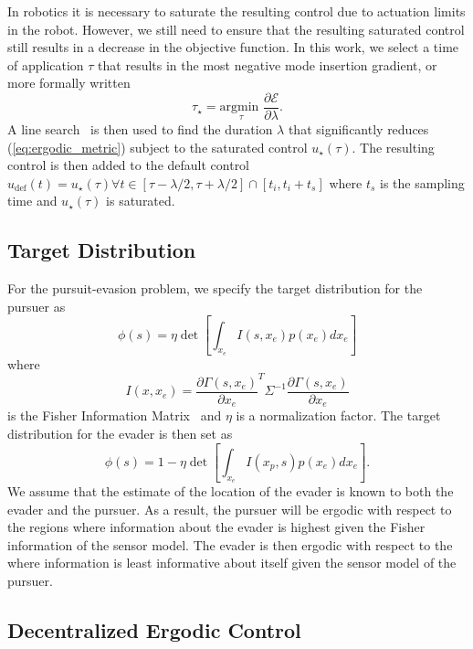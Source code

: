 \documentclass[conference]{IEEEtran}
\begin{document}
In robotics it is necessary to saturate the resulting control due to actuation limits in the robot. 
However, we still need to ensure that the resulting saturated control still results in a decrease in the objective function.
In this work, we select a time of application $\tau$ that results in the most negative mode insertion gradient, or more formally written
\begin{equation*}
\tau_\star= \underset{\tau}{\text{argmin }} \frac{\partial \mathcal{E}}{\partial \lambda}.
\end{equation*}
A line search~\cite{armijo1966minimization} is then used to find the duration $\lambda$ that significantly reduces (\ref{eq:ergodic_metric}) subject to the saturated control $u_\star(\tau)$.
The resulting control is then added to the default control $u_\text{def}(t) = u_\star(\tau) \forall t \in \left[ \tau-\lambda/2, \tau+\lambda/2 \right] \cap \left[ t_i, t_i+t_s\right]$ where $t_s$ is the sampling time and $u_\star(\tau)$ is saturated.

\subsection{Target Distribution}

For the pursuit-evasion problem, we specify the target distribution for the pursuer as 
\begin{equation}
\phi(s) = \eta \det \left[ \int_{x_e} I(s, x_e) p(x_e) dx_e \right]
\end{equation}
where 
\begin{equation}
I(x,x_e) =  \frac{\partial \Gamma(s, x_e)}{\partial x_e}^T \Sigma^{-1} \frac{\partial \Gamma(s, x_e)}{\partial x_e}
\end{equation}
is the Fisher Information Matrix~\cite{++} and $\eta$ is a normalization factor.
The target distribution for the evader is then set as 
\begin{equation}
\phi(s) = 1 - \eta \det \left[ \int_{x_e} I (x_p, s) p(x_e) dx_e\right].
\end{equation}
We assume that the estimate of the location of the evader is known to both the evader and the pursuer. 
As a result, the pursuer will be ergodic with respect to the regions where information about the evader is highest given the Fisher information of the sensor model. 
The evader is then ergodic with respect to the where information is least informative about itself given the sensor model of the pursuer. 

\subsection{Decentralized Ergodic Control}
\end{document}
